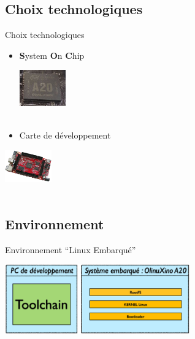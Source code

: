 \documentclass[11pt]{beamer}
\begin{document}
	\subsection{Choix technologiques}
	\begin{frame}[label=choix]{Choix technologiques}
	\begin{itemize}
	\item \textbf<2>{S}ystem \textbf<2>{O}n \textbf<2>{C}hip\\
	\begin{center}
		  \includegraphics[width=2cm]{common/220px-AllWinner_A20.jpg}\\
		  \hyperlink{SoC}{}\\
	\end{center}
	\item Carte de développement
	\end{itemize}
	\begin{center}
		  \includegraphics[width=2cm]{common/A20-OLinuXino-MICRO-0.jpg}\\
		  \hyperlink{SbC}{} \hyperlink{SbC_2}{}\\
	\end{center}
	\end{frame}
	
	\subsection{Environnement}
	\begin{frame}{Environnement ``Linux Embarqué''}
	\begin{center}
	\includegraphics[width=8cm]{common/arcg.png}	
	\end{center}
	\end{frame}
	
\end{document}
